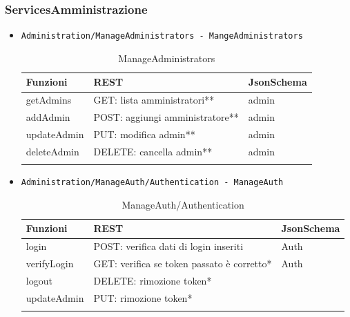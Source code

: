 \documentclass[../DefinizioneDiProdotto_v2.0.0.tex]{subfiles}
\begin{document}
\subsubsection{ServicesAmministrazione}
\begin{itemize}
	\item \texttt{Administration/ManageAdministrators - MangeAdministrators}
	      \begin{longtable}[c] { >{\centering\arraybackslash}p{3cm} >{\centering\arraybackslash}p{6cm} >{\centering\arraybackslash}p{3cm}}
	      	\toprule
	      	\centerline{\textbf{Funzioni}} & \centerline{\textbf{REST}}      & \centerline{\textbf{JsonSchema}} \\
	      	\midrule
	      	getAdmins                      & GET: lista amministratori**     & admin                            \\
	      	\addlinespace[0.3em]
	      	\midrule
	      	\addlinespace[0.3em]
	      	addAdmin                       & POST: aggiungi amministratore** & admin                            \\
	      	\addlinespace[0.3em]
	      	\midrule
	      	\addlinespace[0.3em]
	      	updateAdmin                    & PUT: modifica admin**           & admin                            \\
	      	\addlinespace[0.3em]
	      	\midrule
	      	\addlinespace[0.3em]
	      	deleteAdmin                    & DELETE: cancella admin**        & admin                            \\
	      	\bottomrule
	      	\caption{ManageAdministrators}
	      \end{longtable}

	\item \texttt{Administration/ManageAuth/Authentication - ManageAuth}
	      \begin{longtable}[c] { >{\centering\arraybackslash}p{3cm} >{\centering\arraybackslash}p{6cm} >{\centering\arraybackslash}p{3cm}}
	      	\toprule
	      	\centerline{\textbf{Funzioni}} & \centerline{\textbf{REST}}                  & \centerline{\textbf{JsonSchema}} \\
	      	\midrule
	      	login                          & POST: verifica dati di login inseriti       & Auth                             \\
	      	\addlinespace[0.3em]
	      	\midrule
	      	\addlinespace[0.3em]
	      	verifyLogin                    & GET: verifica se token passato è corretto* & Auth                             \\
	      	\addlinespace[0.3em]
	      	\midrule
	      	\addlinespace[0.3em]
	      	logout                         & DELETE: rimozione token*                    &                                  \\
	      	\addlinespace[0.3em]
	      	\midrule
	      	\addlinespace[0.3em]
	      	updateAdmin                    & PUT: rimozione token*                       &                                  \\
	      	\bottomrule
	      	\caption{ManageAuth/Authentication}
	      \end{longtable}


\end{itemize}
\end{document}
